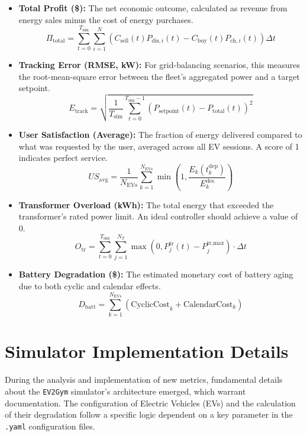 \begin{itemize}
    \item \textbf{Total Profit (\$):} The net economic outcome, calculated as revenue from energy sales minus the cost of energy purchases.
    \[
    \Pi_{\text{total}} = \sum_{t=0}^{T_{\text{sim}}} \sum_{i=1}^{N} \left( C_{\text{sell}}(t) P_{\text{dis},i}(t) - C_{\text{buy}}(t) P_{\text{ch},i}(t) \right) \Delta t
    \]
    
    \item \textbf{Tracking Error (RMSE, kW):} For grid-balancing scenarios, this measures the root-mean-square error between the fleet's aggregated power and a target setpoint.
    \[
    E_{\text{track}} = \sqrt{\frac{1}{T_{\text{sim}}} \sum_{t=0}^{T_{\text{sim}}-1} \left( P_{\text{setpoint}}(t) - P_{\text{total}}(t) \right)^2}
    \]
    
    \item \textbf{User Satisfaction (Average):} The fraction of energy delivered compared to what was requested by the user, averaged across all EV sessions. A score of 1 indicates perfect service.
    \[
    US_{\text{avg}} = \frac{1}{N_{\text{EVs}}} \sum_{k=1}^{N_{\text{EVs}}} \min \left(1, \frac{E_k(t_k^{\text{dep}})}{E_k^{\text{des}}} \right)
    \]
    
    \item \textbf{Transformer Overload (kWh):} The total energy that exceeded the transformer's rated power limit. An ideal controller should achieve a value of 0.
    \[
    O_{\text{tr}} = \sum_{t=0}^{T_{\text{sim}}} \sum_{j=1}^{N_T} \max(0, P_j^{\text{tr}}(t) - P_j^{\text{tr,max}}) \cdot \Delta t
    \]
    
    \item \textbf{Battery Degradation (\$):} The estimated monetary cost of battery aging due to both cyclic and calendar effects.
    \[
    D_{\text{batt}} = \sum_{k=1}^{N_{\text{EVs}}} (\text{CyclicCost}_k + \text{CalendarCost}_k)
    \]
\end{itemize}

\section{Simulator Implementation Details}
\label{sec:sim_architecture}
During the analysis and implementation of new metrics, fundamental details about the \texttt{EV2Gym} simulator's architecture emerged, which warrant documentation. The configuration of Electric Vehicles (EVs) and the calculation of their degradation follow a specific logic dependent on a key parameter in the \texttt{.yaml} configuration files.

